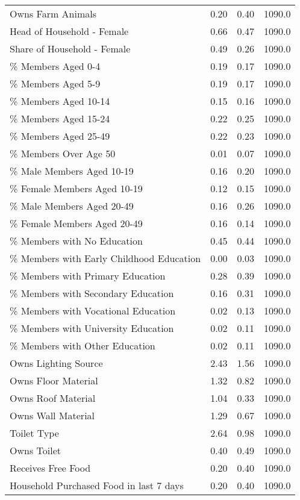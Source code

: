 \begin{longtable}{lrrr}
Owns Farm Animals                        &  0.20 &  0.40 &  1090.0 \\
Head of Household - Female               &  0.66 &  0.47 &  1090.0 \\
Share of Household - Female              &  0.49 &  0.26 &  1090.0 \\
\% Members Aged 0-4                       &  0.19 &  0.17 &  1090.0 \\
\% Members Aged 5-9                       &  0.19 &  0.17 &  1090.0 \\
\% Members Aged 10-14                     &  0.15 &  0.16 &  1090.0 \\
\% Members Aged 15-24                     &  0.22 &  0.25 &  1090.0 \\
\% Members Aged 25-49                     &  0.22 &  0.23 &  1090.0 \\
\% Members Over Age 50                    &  0.01 &  0.07 &  1090.0 \\
\% Male Members Aged 10-19                &  0.16 &  0.20 &  1090.0 \\
\% Female Members Aged 10-19              &  0.12 &  0.15 &  1090.0 \\
\% Male Members Aged 20-49                &  0.16 &  0.26 &  1090.0 \\
\% Female Members Aged 20-49              &  0.16 &  0.14 &  1090.0 \\
\% Members with No Education              &  0.45 &  0.44 &  1090.0 \\
\% Members with Early Childhood Education &  0.00 &  0.03 &  1090.0 \\
\% Members with Primary Education         &  0.28 &  0.39 &  1090.0 \\
\% Members with Secondary Education       &  0.16 &  0.31 &  1090.0 \\
\% Members with Vocational Education      &  0.02 &  0.13 &  1090.0 \\
\% Members with University Education      &  0.02 &  0.11 &  1090.0 \\
\% Members with Other Education           &  0.02 &  0.11 &  1090.0 \\
Owns Lighting Source                     &  2.43 &  1.56 &  1090.0 \\
Owns Floor Material                      &  1.32 &  0.82 &  1090.0 \\
Owns Roof Material                       &  1.04 &  0.33 &  1090.0 \\
Owns Wall Material                       &  1.29 &  0.67 &  1090.0 \\
Toilet Type                              &  2.64 &  0.98 &  1090.0 \\
Owns Toilet                              &  0.40 &  0.49 &  1090.0 \\
Receives Free Food                       &  0.20 &  0.40 &  1090.0 \\
Household Purchased Food in last 7 days  &  0.20 &  0.40 &  1090.0 \\
\end{longtable}

